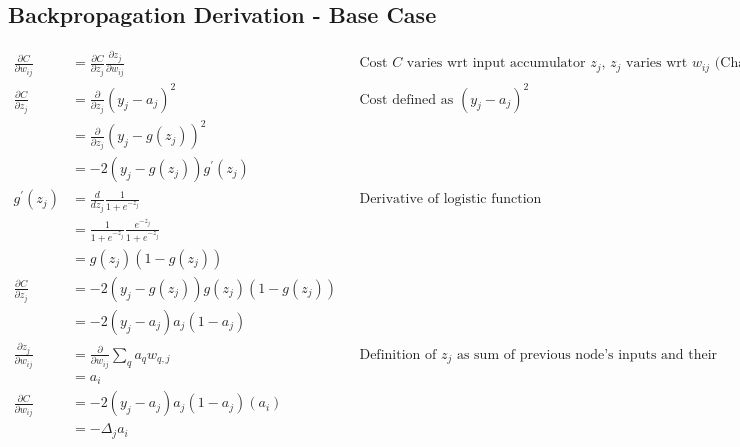 \documentclass[11pt, oneside]{article}
\begin{document}
\subsection{Backpropagation Derivation - Base Case}
	\begin{align*}
		\frac{\partial C}{\partial w_{ij}} &= \frac{\partial C}{\partial z_{j}} \frac{\partial z_{j}}{\partial w_{ij}} &&
			\text{Cost $C$ varies wrt input accumulator $z_j$, $z_j$ varies wrt $w_{ij}$ (Chain Rule)}\\
		\frac{\partial C}{\partial z_j} &= \frac{\partial}{\partial z_j} (y_j - a_j)^2 &&
			\text{Cost defined as $(y_j - a_j)^2$}\\
		&= \frac{\partial}{\partial z_j} (y_j - g(z_j))^2\\
		&= -2(y_j - g(z_j))g^\prime(z_j)\\
		g^\prime(z_j) &= \frac{d}{dz_j} \frac{1}{1+e^{-z_j}} &&
			\text{Derivative of logistic function}\\
		&= \frac{1}{1+e^{-z_j}} \frac{e^{-z_j}}{1+e^{-z_j}}\\
		&= g(z_j) (1-g(z_j))\\
		\frac{\partial C}{\partial z_j} &= -2(y_j - g(z_j))g(z_j)(1-g(z_j))\\
		&= -2(y_j - a_j)a_j(1-a_j)\\
		\frac{\partial z_{j}}{\partial w_{ij}} &= \frac{\partial}{\partial w_{ij}} \sum_q a_q w_{q,j} &&
			\text{Definition of $z_j$ as sum of previous node's inputs and their weights}\\
		&= a_i\\
		\frac{\partial C}{\partial w_{ij}} &= -2(y_j - a_j)a_j(1-a_j)(a_i)\\
		&= -\Delta_j a_i
	\end{align*}
\end{document}
